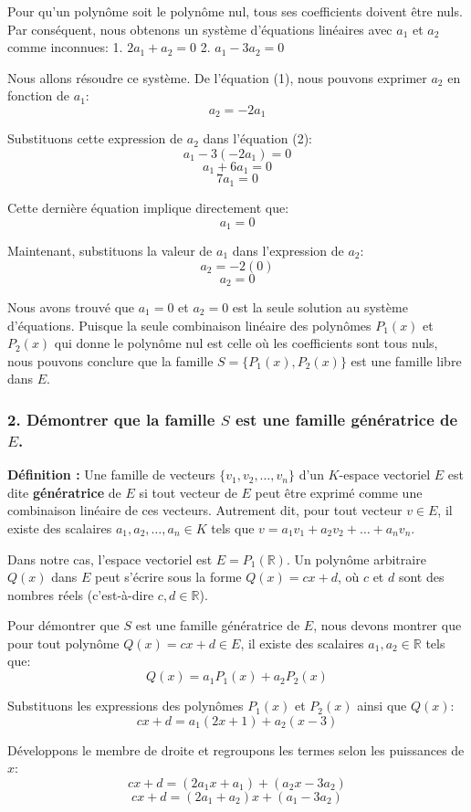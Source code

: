\documentclass{report}
\begin{document}
Pour qu'un polynôme soit le polynôme nul, tous ses coefficients doivent être nuls. Par conséquent, nous obtenons un système d'équations linéaires avec $a_1$ et $a_2$ comme inconnues:
1.  $2a_1 + a_2 = 0$
2.  $a_1 - 3a_2 = 0$

Nous allons résoudre ce système.
De l'équation (1), nous pouvons exprimer $a_2$ en fonction de $a_1$:
$$a_2 = -2a_1$$

Substituons cette expression de $a_2$ dans l'équation (2):
$$a_1 - 3(-2a_1) = 0$$
$$a_1 + 6a_1 = 0$$
$$7a_1 = 0$$

Cette dernière équation implique directement que:
$$a_1 = 0$$

Maintenant, substituons la valeur de $a_1$ dans l'expression de $a_2$:
$$a_2 = -2(0)$$
$$a_2 = 0$$

Nous avons trouvé que $a_1 = 0$ et $a_2 = 0$ est la seule solution au système d'équations.
Puisque la seule combinaison linéaire des polynômes $P_1(x)$ et $P_2(x)$ qui donne le polynôme nul est celle où les coefficients sont tous nuls, nous pouvons conclure que la famille $S = \{P_1(x), P_2(x)\}$ est une famille libre dans $E$.

\subsubsection*{2. Démontrer que la famille $S$ est une famille génératrice de $E$.}

\textbf{Définition :} Une famille de vecteurs $\{v_1, v_2, \ldots, v_n\}$ d'un $K$-espace vectoriel $E$ est dite \textbf{génératrice} de $E$ si tout vecteur de $E$ peut être exprimé comme une combinaison linéaire de ces vecteurs. Autrement dit, pour tout vecteur $v \in E$, il existe des scalaires $a_1, a_2, \ldots, a_n \in K$ tels que $v = a_1 v_1 + a_2 v_2 + \ldots + a_n v_n$.

Dans notre cas, l'espace vectoriel est $E = P_1(\mathbb{R})$. Un polynôme arbitraire $Q(x)$ dans $E$ peut s'écrire sous la forme $Q(x) = cx+d$, où $c$ et $d$ sont des nombres réels (c'est-à-dire $c, d \in \mathbb{R}$).

Pour démontrer que $S$ est une famille génératrice de $E$, nous devons montrer que pour tout polynôme $Q(x) = cx+d \in E$, il existe des scalaires $a_1, a_2 \in \mathbb{R}$ tels que:
$$Q(x) = a_1 P_1(x) + a_2 P_2(x)$$

Substituons les expressions des polynômes $P_1(x)$ et $P_2(x)$ ainsi que $Q(x)$:
$$cx+d = a_1 (2x+1) + a_2 (x-3)$$

Développons le membre de droite et regroupons les termes selon les puissances de $x$:
$$cx+d = (2a_1 x + a_1) + (a_2 x - 3a_2)$$
$$cx+d = (2a_1 + a_2)x + (a_1 - 3a_2)$$
\end{document}
